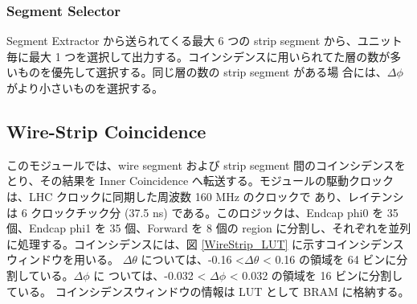 \subsubsection*{Segment Selector}
Segment Extractor から送られてくる最大 6 つの strip segment から、ユニット毎に最大 1 つを選択して出力する。コインシデンスに用いられてた層の数が多いものを優先して選択する。同じ層の数の strip segment がある場
合には、$\Delta\phi$ がより小さいものを選択する。

\subsection*{Wire-Strip Coincidence}
このモジュールでは、wire segment および strip segment 間のコインシデンスをとり、その結果を Inner Coincidence へ転送する。モジュールの駆動クロックは、LHC クロックに同期した周波数 160 MHz のクロックで あり、レイテンシは 6 クロックチック分 (37.5 ns) である。このロジックは、Endcap phi0 を 35 個、Endcap phi1 を 35 個、Forward を 8 個の region に分割し、それぞれを並列に処理する。コインシデンスには、図 \ref{WireStrip_LUT} に示すコインシデンスウィンドウを用いる。
$\Delta\theta$ については、-0.16 <$\Delta\theta$ < 0.16 の領域を 64 ビンに分割している。$\Delta\phi$ に ついては、-0.032 < $\Delta\phi$ < 0.032 の領域を 16 ビンに分割している。
コインシデンスウィンドウの情報は LUT として BRAM に格納する。

